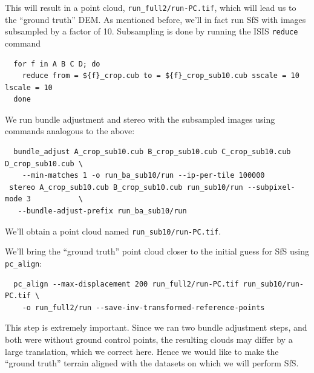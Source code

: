 This will result in a point cloud, \verb#run_full2/run-PC.tif#, which will
lead us to the ``ground truth'' DEM. As mentioned
before, we'll in fact run SfS with images subsampled by a factor of
10. Subsampling is done by running the ISIS \texttt{reduce} command
\begin{verbatim}
  for f in A B C D; do 
    reduce from = ${f}_crop.cub to = ${f}_crop_sub10.cub sscale = 10 lscale = 10
  done
\end{verbatim}

We run bundle adjustment and stereo with the subsampled images using
commands analogous to the above:
\begin{verbatim}
  bundle_adjust A_crop_sub10.cub B_crop_sub10.cub C_crop_sub10.cub D_crop_sub10.cub \
    --min-matches 1 -o run_ba_sub10/run --ip-per-tile 100000
 stereo A_crop_sub10.cub B_crop_sub10.cub run_sub10/run --subpixel-mode 3           \
   --bundle-adjust-prefix run_ba_sub10/run
\end{verbatim}
We'll obtain a point cloud named \verb#run_sub10/run-PC.tif#.

We'll bring the ``ground truth'' point cloud closer to the initial guess
for SfS using \texttt{pc\_align}:
\begin{verbatim}
  pc_align --max-displacement 200 run_full2/run-PC.tif run_sub10/run-PC.tif \
    -o run_full2/run --save-inv-transformed-reference-points
\end{verbatim}
This step is extremely important. Since we ran two bundle adjustment
steps, and both were without ground control points, the resulting clouds
may differ by a large translation, which we correct here. Hence we would like to 
make the ``ground truth'' terrain aligned with the datasets on which we 
will perform SfS. 

